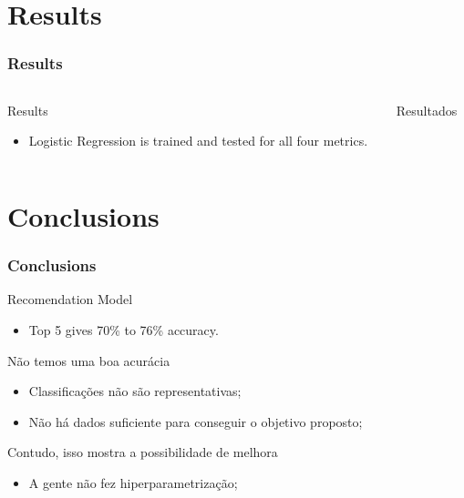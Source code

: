 \section{Results}
\begin{frame}
	\frametitle{Results}
	\begin{columns}
	
	\begin{column}{0.5\textwidth}

		\begin{block}{Results} 
			\begin{itemize}
				\item Logistic Regression is trained and tested for all four metrics.
			\end{itemize}
		\end{block}
	
 	\end{column}
			
	\begin{column}{0.5\textwidth}
		\begin{table}
		\centering
			\resizebox{0.6\textwidth}{!}{
				
			}
			\caption{Resultados}
		\end{table}
	\end{column}

\end{columns}
\end{frame}
\section{Conclusions}
\begin{frame}
	\frametitle{Conclusions}

	\begin{block}{Recomendation Model} 
		\begin{itemize}
			\item Top 5 gives 70\% to 76\% accuracy.
		\end{itemize}
	\end{block}

	\begin{alertblock}{Não temos uma boa acurácia} 
	\begin{itemize}
		\item  Classificações não são representativas;
		\item  Não há dados suficiente para conseguir o objetivo proposto;
	\end{itemize}
	\end{alertblock}

	\begin{exampleblock}{Contudo, isso mostra a possibilidade de melhora} 
	\begin{itemize}
		\item  A gente não fez hiperparametrização;
	\end{itemize}
	\end{exampleblock}
\end{frame}
